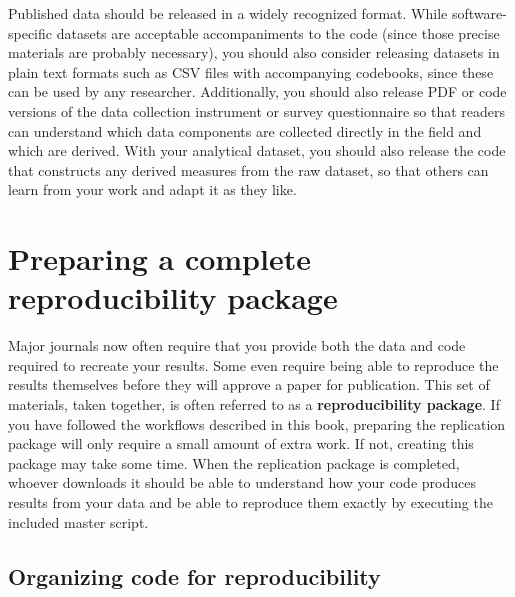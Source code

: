 Published data should be released in a widely recognized format.
While software-specific datasets are acceptable accompaniments to the code
(since those precise materials are probably necessary),
you should also consider releasing datasets in plain text formats
such as CSV files with accompanying codebooks,
since these can be used by any researcher.
Additionally, you should also release PDF or code versions of
the data collection instrument or survey questionnaire
so that readers can understand which data components are
collected directly in the field and which are derived.
With your analytical dataset,
you should also release the code
that constructs any derived measures
from the raw dataset,
so that others can learn from your work and adapt it as they like.

\section{Preparing a complete reproducibility package}

Major journals now often require that you provide both the data and code required to recreate your results.
Some even require being able to reproduce the results themselves
before they will approve a paper for publication.
This set of materials, taken together,
is often referred to as a \textbf{reproducibility package}.
If you have followed the workflows described in this book,
preparing the replication package will only require a small amount of extra work.
If not, creating this package may take some time.
When the replication package is completed,
whoever downloads it should be able
to understand how your code produces results from your data
and be able to reproduce them exactly by executing the included master script.

\subsection{Organizing code for reproducibility}

